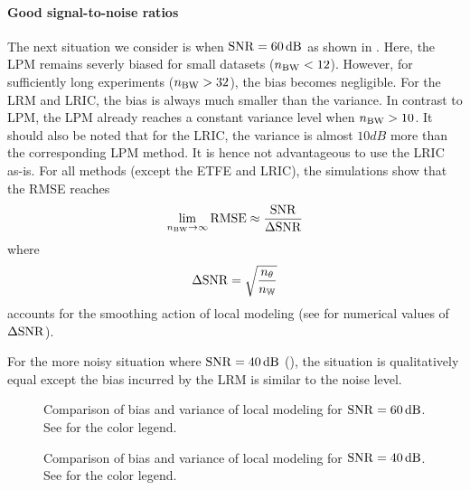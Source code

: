 \paragraph{Good signal-to-noise ratios}
The next situation we consider is when $\SNR=60\unit{dB}$ as shown in .
Here, the \gls{LPM} remains severly biased for small datasets ($n_{\mathrm{BW}} < 12$).
However, for sufficiently long experiments ($n_{\mathrm{BW}} > 32$), the bias becomes negligible.
For the \gls{LRM} and \gls{LRIC}, the bias is always much smaller than the variance.
In contrast to \gls{LPM}, the \gls{LPM} already reaches a constant variance level when $n_{\mathrm{BW}} > 10$.
It should also be noted that for the \gls{LRIC}, the variance is almost $10\unit{dB}$ more than the corresponding \gls{LPM} method.
It is hence not advantageous to use the \gls{LRIC} as-is.
For all methods (except the \gls{ETFE} and \gls{LRIC}), the simulations show that the \gls{RMSE} reaches
\begin{equation}
  \lim_{n_{\mathrm{BW}} \to \infty} \mathrm{RMSE} \approx \frac{\mathrm{SNR}}{\Delta \mathrm{SNR}}
\end{equation}
where
\begin{equation}
  \Delta\mathrm{SNR} = \sqrt{\frac{n_{\theta}}{n_{\mathbb{W}}}}
\end{equation}
accounts for the smoothing action of local modeling (see  for numerical values of $\Delta \mathrm{SNR}$).

For the more noisy situation where $\SNR = 40 \unit{dB}$ (), the situation is qualitatively equal except the bias incurred by the \gls{LRM} is similar to the noise level.

\begin{figure}[phtb]
  \centering
  \setlength{\figurewidth}{0.85\columnwidth}
  \setlength{\figureheight}{0.62\figurewidth}
  
  \caption[Comparison of local models for $\SNR = 60 \unit{dB}$]{Comparison of bias and variance of local modeling for $\SNR=60\unit{dB}$. See  for the color legend.}
  \label{fig:nparam:comparison:hiSNR}
\end{figure}

\begin{figure}[phbt]
  \centering
  \setlength{\figurewidth}{0.85\columnwidth}
  \setlength{\figureheight}{0.62\figurewidth}
  
  \caption[Comparison of local models for $\SNR = 40 \unit{dB}$]{Comparison of bias and variance of local modeling for $\SNR=40\unit{dB}$. See  for the color legend.}
  \label{fig:nparam:comparison:midSNR}
\end{figure}

